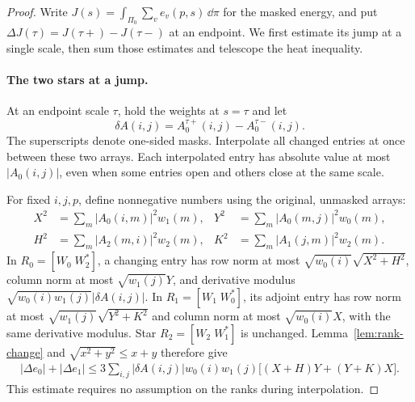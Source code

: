 \begin{proof}
Write $J(s)=\int_{\Pi_0}\sum_ve_v(p,s)\,\dd\pi$ for the masked
energy, and put $\Delta J(\tau)=J(\tau+)-J(\tau-)$ at an endpoint.
We first estimate its jump at a single scale, then sum those
estimates and telescope the heat inequality.

\paragraph{The two stars at a jump.}
At an endpoint scale $\tau$, hold the weights at $s=\tau$ and let
\[
 \delta A(i,j)=A_0^{\tau+}(i,j)-A_0^{\tau-}(i,j).
\]
The superscripts denote one-sided masks.  Interpolate all changed
entries at once between these two arrays.  Each interpolated entry
has absolute value at most $|A_0(i,j)|$, even when some entries open
and others close at the same scale.

For fixed $i,j,p$, define nonnegative numbers using the original,
unmasked arrays:
\begin{equation}\label{eq:jump-slice-quantities}
 \begin{aligned}
 X^2&=\sum_m|A_0(i,m)|^2w_1(m),&
 Y^2&=\sum_m|A_0(m,j)|^2w_0(m),\\
 H^2&=\sum_m|A_2(m,i)|^2w_2(m),&
 K^2&=\sum_m|A_1(j,m)|^2w_2(m).
 \end{aligned}
\end{equation}
In $R_0=[W_0\;W_2^*]$, a changing entry has row norm at most
$\sqrt{w_0(i)}\sqrt{X^2+H^2}$, column norm at most
$\sqrt{w_1(j)}Y$, and derivative modulus
$\sqrt{w_0(i)w_1(j)}|\delta A(i,j)|$.
In $R_1=[W_1\;W_0^*]$, its adjoint entry has row norm at most
$\sqrt{w_1(j)}\sqrt{Y^2+K^2}$ and column norm at most
$\sqrt{w_0(i)}X$, with the same derivative modulus.
Star $R_2=[W_2\;W_1^*]$ is unchanged.  Lemma~\ref{lem:rank-change}
and $\sqrt{x^2+y^2}\le x+y$ therefore give
\begin{equation}\label{eq:jump-entry-bound}
 \begin{aligned}
 |\Delta e_0|+|\Delta e_1|
 \le3\sum_{i,j}|\delta A(i,j)|w_0(i)w_1(j)
       \bigl[(X+H)Y+(Y+K)X\bigr].
 \end{aligned}
\end{equation}
This estimate requires no assumption on the ranks during interpolation.


\end{proof}

